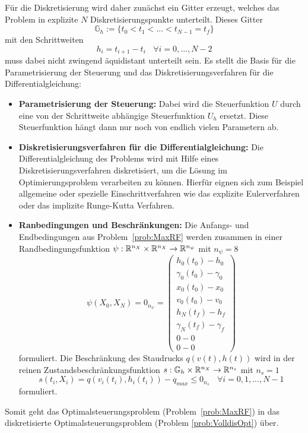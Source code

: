 Für die Diskretisierung wird daher zunächst ein Gitter erzeugt, welches das Problem in explizite $N$ Diskretisierungspunkte unterteilt. Dieses Gitter 
\[\mathbb{G}_h := \lbrace t_0 < t_1 < ... < t_{N-1} = t_f \rbrace\]
mit den Schrittweiten 
\[h_i = t_{i+1} - t_i \ \ \ \ \forall i = 0,...,N-2\]
muss dabei nicht zwingend äquidistant unterteilt sein. Es stellt die Basis für die Parametrisierung der Steuerung und das Diskretisierungsverfahren für die Differentialgleichung:
\begin{itemize}
    \item \textbf{Parametrisierung der Steuerung:} Dabei wird die Steuerfunktion $U$ durch eine von der Schrittweite abhängige Steuerfunktion $U_h$ ersetzt. Diese Steuerfunktion hängt dann nur noch von endlich vielen Parametern ab.

    \item \textbf{Diskretisierungsverfahren für die Differentialgleichung:} Die Differentialgleichung des Problems wird mit Hilfe eines Diskretisierungsverfahren diskretisiert, um die Lösung im Optimierungsproblem verarbeiten zu können. Hierfür eignen sich zum Beispiel allgemeine oder spezielle Einschrittverfahren wie das explizite Eulerverfahren oder das implizite Runge-Kutta Verfahren.

    \item \textbf{Ranbedingungen und Beschränkungen:} Die Anfangs- und Endbedingungen aus Problem~\ref{prob:MaxRF} werden zusammen in einer Randbedingungsfunktion $\psi : \mathbb{R}^{n_X} \times \mathbb{R}^{n_X} \to \mathbb{R}^{n_{\psi}}$ mit $n_{\psi} = 8$
    \[\psi(X_0,X_N) = 0_{n_{\psi}} = 
    \begin{pmatrix}
        h_0(t_0) - h_0 \\ 
        \gamma_0(t_0) - \gamma_0 \\
        x_0(t_0) - x_0 \\ 
        v_0(t_0) - v_0 \\ 
        h_N(t_f) - h_f \\ 
        \gamma_N(t_f) - \gamma_f \\
        0 - 0 \\ 
        0 - 0
    \end{pmatrix}\] formuliert. Die Beschränkung des Staudrucks $q(v(t),h(t))$ wird in der reinen Zustandsbeschränkungsfunktion $s : \mathbb{G}_h \times \mathbb{R}^{n_X} \to \mathbb{R}^{n_s}$ mit $n_s = 1$
    \[s(t_i,X_i) = q(v_i(t_i),h_i(t_i)) - q_{max} \leq 0_{n_s} \ \ \ \ \forall i = 0,1,...,N-1\] formuliert.
\end{itemize}
Somit geht das Optimalsteuerungsproblem (Problem~\ref{prob:MaxRF}) in das diskretisierte Optimalsteuerungsproblem (Problem \ref{prob:VolldisOpt}) über.

